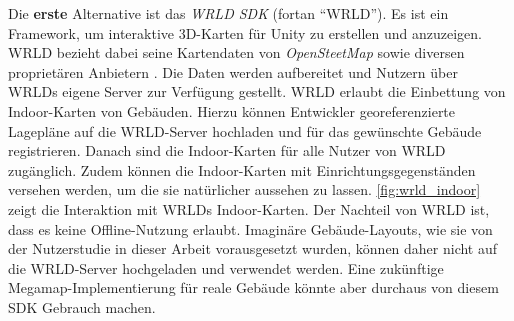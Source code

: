 Die \textbf{erste} Alternative ist das \emph{WRLD SDK} (fortan \enquote{WRLD}).
Es ist ein Framework, um interaktive 3D-Karten für Unity zu erstellen und anzuzeigen.
WRLD bezieht dabei seine Kartendaten von \emph{OpenSteetMap} sowie diversen proprietären Anbietern \parencite{WRLD2018}.
Die Daten werden aufbereitet und Nutzern über WRLDs eigene Server zur Verfügung gestellt.
WRLD erlaubt die Einbettung von Indoor-Karten von Gebäuden.
Hierzu können Entwickler georeferenzierte Lagepläne auf die WRLD-Server hochladen und für das gewünschte Gebäude registrieren.
Danach sind die Indoor-Karten für alle Nutzer von WRLD zugänglich.
Zudem können die Indoor-Karten mit Einrichtungsgegenständen versehen werden, um die sie natürlicher aussehen zu lassen.
\autoref{fig:wrld_indoor} zeigt die Interaktion mit WRLDs Indoor-Karten.
Der Nachteil von WRLD ist, dass es keine Offline-Nutzung erlaubt.
Imaginäre Gebäude-Layouts, wie sie von der Nutzerstudie in dieser Arbeit vorausgesetzt wurden, können daher nicht auf die WRLD-Server hochgeladen und verwendet werden.
Eine zukünftige Megamap-Implementierung für reale Gebäude könnte aber durchaus von diesem SDK Gebrauch machen.
